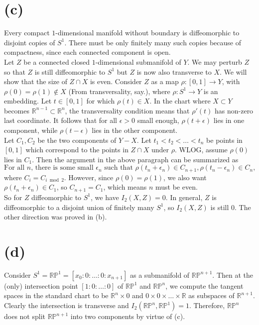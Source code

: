 \documentclass{amsbook}
\theoremstyle{theorem}
\theoremstyle{plain}
\theoremstyle{remark}
\newcommand{\R}{\mathbb R}
\renewcommand{\P}{\mathbb P}
\begin{document}
\section*{(c)}
Every compact $1$-dimensional manifold without boundary is diffeomorphic to disjoint copies of $S^1$. There must be only finitely many such copies because of compactness, since each connected component is open. \\

Let $Z$ be a connected closed $1$-dimensional submanifold of $Y$. We may perturb $Z$ so that $Z$ is still diffeomorphic to $S^1$ but $Z$ is now also transverse to $X$. We will show that the size of $Z \cap X$ is even. Consider $Z$ as a map $\rho: [0,1] \to Y$, with $\rho(0) = \rho(1) \not \in X$ (From transversality, say.), where $\rho: S^1 \to Y$ is an embedding. Let $t \in [0,1]$ for which $\rho(t) \in X$. In the chart where $X\subset Y$ becomes $\R^{n-1}\subset \R^n$, the transversality condition means that $\rho'(t)$ has non-zero last coordinate. It follows that for all $\epsilon > 0$ small enough, $\rho(t+\epsilon)$ lies in one component, while $\rho(t - \epsilon)$ lies in the other component.\\ 

Let $C_1, C_2$ be the two components of $Y-X$. Let $t_1 < t_2 < \dots < t_n$ be points in $[0,1]$ which correspond to the points in $Z\cap X$ under $\rho$. WLOG, assume $\rho(0)$ lies in $C_1$. Then the argument in the above paragraph can be summarized as \[\text{For all $n$, there is some small $\epsilon_n$ such that } \rho(t_n + \epsilon_n) \in C_{n+1}, \rho(t_n-\epsilon_n) \in C_n,\] where $C_i = C_{i\bmod 2}$. However, since $\rho(0) = \rho(1)$, we also want $\rho(t_n+\epsilon_n) \in C_1$, so $C_{n+1} = C_1$, which means $n$ must be even.\\

So for $Z$ diffeomorphic to $S^1$, we have $I_2(X,Z) = 0$. In general, $Z$ is diffeomorphic to a disjoint union of finitely many $S^1$, so $I_2(X,Z)$ is still $0$. The other direction was proved in (b).

\section*{(d)}

Consider $S^1 = \R\P^1 = [x_0:0:\dots:0:x_{n+1}]$ as a submanifold of $\R\P^{n+1}$. Then at the (only) intersection point $[1:0:\dots:0]$ of $\R\P^1$ and $\R\P^n$, we compute the tangent spaces in the standard chart to be $\R^n \times 0$ and $0\times 0 \times \dots \times \R$ as subspaces of $\R^{n+1}$. Clearly the intersection is transverse and $I_2(\R\P^n, \R\P^1) = 1$. Therefore, $\R\P^n$ does not split $\R\P^{n+1}$ into two components by virtue of (c). \\
\end{document}
